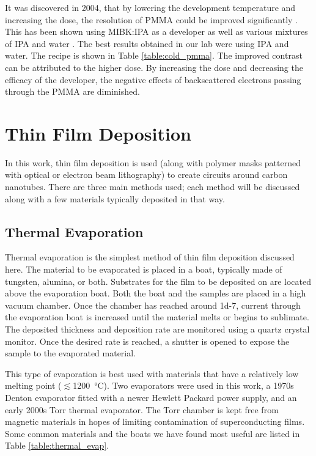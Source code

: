 It was discovered in 2004, that by lowering the development temperature and increasing the dose, the resolution of PMMA could be improved significantly \cite{Hu2004}. This has been shown using MIBK:IPA as a developer as well as various mixtures of IPA and water \cite{Cord2007, Yasin2002, Rooks2002, Koshelev2011}. The best results obtained in our lab were using IPA and water. The recipe is shown in Table \ref{table:cold_pmma}. The improved contrast can be attributed to the higher dose. By increasing the dose and decreasing the efficacy of the developer, the negative effects of backscattered electrons passing through the PMMA are diminished.

\section{Thin Film Deposition}
\label{sec:thin_film}

In this work, thin film deposition is used (along with polymer masks patterned with optical or electron beam lithography) to create circuits around carbon nanotubes. There are three main methods used; each method will be discussed along with a few materials typically deposited in that way. 

\subsection{Thermal Evaporation}
\label{subsec:thermal_evap}

Thermal evaporation is the simplest method of thin film deposition discussed here. The material to be evaporated is placed in a boat, typically made of tungsten, alumina, or both. Substrates for the film to be deposited on are located above the evaporation boat. Both the boat and the samples are placed in a high vacuum chamber. Once the chamber has reached around \SI{1d-7}{\torr}, current through the evaporation boat is increased until the material melts or begins to sublimate. The deposited thickness and deposition rate are monitored using a quartz crystal monitor. Once the desired rate is reached, a shutter is opened to expose the sample to the evaporated material. 

This type of evaporation is best used with materials that have a relatively low melting point ($\lesssim$\SI{1200}{\degreeCelsius}). Two evaporators were used in this work, a 1970s Denton evaporator fitted with a newer Hewlett Packard power supply, and an early 2000s Torr thermal evaporator. The Torr chamber is kept free from magnetic materials in hopes of limiting contamination of superconducting films. Some common materials and the boats we have found most useful are listed in Table \ref{table:thermal_evap}.

